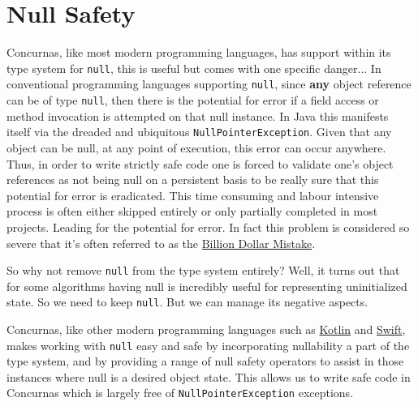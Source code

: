 \documentclass[conc-doc]{subfiles}
\begin{document}
	
	\chapter[Null Safety]{Null Safety}
	\label{ch:nullsafe}



Concurnas, like most modern programming languages, has support within its type system for \lstinline{null}, this is useful but comes with one specific danger... In conventional programming languages supporting \lstinline{null}, since \textbf{any} object reference can be of type \lstinline{null}, then there is the potential for error if a field access or method invocation is attempted on that null instance. In Java this manifests itself via the dreaded and ubiquitous \lstinline{NullPointerException}. Given that any object can be null, at any point of execution, this error can occur anywhere. Thus, in order to write strictly safe code one is forced to validate one's object references as not being null on a persistent basis to be really sure that this potential for error is eradicated. This time consuming and labour intensive process is often either skipped entirely or only partially completed in most projects. Leading for the potential for error. In fact this problem is considered so severe that it's often referred to as the \href{https://en.wikipedia.org/wiki/Tony_Hoare#Apologies_and_retractions}{Billion Dollar Mistake}.

So why not remove \lstinline{null} from the type system entirely? Well, it turns out that for some algorithms having null is incredibly useful for representing uninitialized state. So we need to keep \lstinline{null}. But we can manage its negative aspects.

Concurnas, like other modern programming languages such as \href{https://kotlinlang.org/}{Kotlin} and \href{https://developer.apple.com/swift/}{Swift}, makes working with \lstinline{null} easy and safe by incorporating nullability a part of the type system, and by providing a range of null safety operators to assist in those instances where null is a desired object state. This allows us to write safe code in Concurnas which is largely free of \lstinline{NullPointerException} exceptions.
\end{document}
